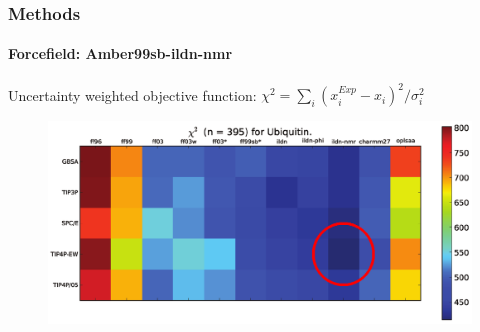 \documentclass[english]{beamer}
\begin{document}
\begin{frame}
    \frametitle{Methods}
    \framesubtitle{Forcefield: Amber99sb-ildn-nmr}

    Uncertainty weighted objective function: $\chi^2 = \sum_i(x_i^{Exp} - x_i)^2 / \sigma_i^2$

    \begin{figure}
        \includegraphics[width=\linewidth]{figures/forcefield_performance.png}
    \end{figure}        

    \tiny

    

\end{frame}   

\end{document}
